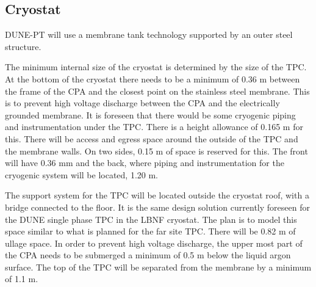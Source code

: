 \label{cryo}
\subsection{Cryostat}



DUNE-PT will use a membrane tank technology supported by an outer steel structure.

The minimum internal size of the cryostat is determined by the size of the TPC.  At the bottom of the 
cryostat there needs to be a minimum of 0.36 m between the frame of the CPA and the closest point on the stainless steel 
membrane.  This is to prevent high voltage discharge between the CPA and the electrically grounded 
membrane. It is foreseen that there would be some cryogenic piping and instrumentation under the TPC.  
There is a height allowance of 0.165 m for this.  There will be access and egress space around the outside 
of the TPC and the membrane walls.  On two sides, 0.15 m of space is reserved for this. The front will have 0.36 mm and the back, where piping and instrumentation for the cryogenic system will be located, 1.20 m.

The support system for the TPC will be located outside the cryostat roof, with a bridge connected to the floor. 
It is the same design solution currently foreseen for the DUNE single phase TPC in the LBNF cryostat.  
The plan is to model this space similar to what is planned for the far site TPC.  There 
will be 0.82 m of ullage space.  In order to prevent high voltage discharge, the upper most part of the CPA 
needs to be submerged a minimum of 0.5 m below the liquid argon surface.  The top of the TPC will be 
separated from the membrane by a minimum of 1.1 m.  

